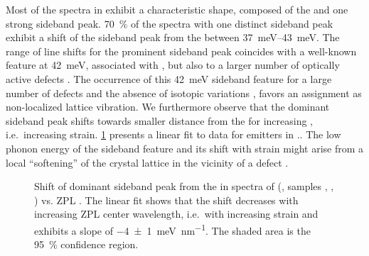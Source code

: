 		Most of the spectra in \vl exhibit a characteristic shape, composed of the \ZPL and one strong sideband peak.
		\SI{70}{\percent} of the \pl spectra with one distinct sideband peak exhibit a shift of the sideband peak from the \ZPL between \SIrange{37}{43}{meV}.
		The range of line shifts for the prominent sideband peak coincides with a well-known feature at \SI{42}{meV}, associated with \sivs \cite{Larkins1971,Sternschulte1994}, but also to a larger number of optically active defects \cite{Sternschulte1994}.
		The occurrence of this \SI{42}{meV} sideband feature for a large number of defects and the absence of isotopic variations \cite{Dietrich2014}, favors an assignment as non-localized lattice vibration.
		We furthermore observe that the dominant sideband peak shifts towards smaller distance from the \ZPL for increasing \ZPL \cwl, i.e.\ increasing strain. \cref{fig::sideband_fit} presents a linear fit to data for emitters in \vl..
		The low phonon energy of the sideband feature and its shift with strain might arise from a local ``softening'' of the crystal lattice in the vicinity of a defect \cite{Sternschulte1994}.

		\begin{figure}[htp]
			\centering
			\caption[Shift of dominant side band peaks for \sivs]{Shift of dominant sideband peak from the \ZPL in spectra of \sivs (\vl, samples \insituF, \insituS, \insituH) vs. ZPL \cwl. The linear fit shows that the shift decreases with increasing ZPL center wavelength, i.e.\ with increasing strain and exhibits a slope of \SI[separate-uncertainty]{-4\pm1}{\milli\electronvolt\per\nano\meter}. The shaded area is the \SI{95}{\percent} confidence region.}
			\label{fig::sideband_fit}
		\end{figure}

